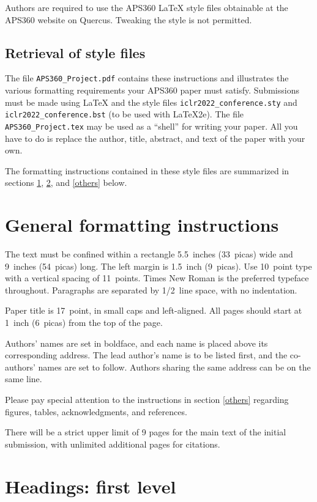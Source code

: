 \documentclass{article} %
\begin{document}
Authors are required to use the APS360 \LaTeX{} style files obtainable at the
APS360 website on Quercus. Tweaking the style is not permitted.

\subsection{Retrieval of style files}

The file \verb+APS360_Project.pdf+ contains these
instructions and illustrates the various formatting requirements your APS360 paper must satisfy.
Submissions must be made using \LaTeX{} and the style files
\verb+iclr2022_conference.sty+ and \verb+iclr2022_conference.bst+ (to be used with \LaTeX{}2e). The file
\verb+APS360_Project.tex+ may be used as a ``shell'' for writing your paper. All you have to do is replace the author, title, abstract, and text of the paper with
your own.

The formatting instructions contained in these style files are summarized in
sections \ref{gen_inst}, \ref{headings}, and \ref{others} below.

\section{General formatting instructions}
\label{gen_inst}

The text must be confined within a rectangle 5.5~inches (33~picas) wide and
9~inches (54~picas) long. The left margin is 1.5~inch (9~picas).
Use 10~point type with a vertical spacing of 11~points. Times New Roman is the
preferred typeface throughout. Paragraphs are separated by 1/2~line space,
with no indentation.

Paper title is 17~point, in small caps and left-aligned.
All pages should start at 1~inch (6~picas) from the top of the page.

Authors' names are
set in boldface, and each name is placed above its corresponding
address. The lead author's name is to be listed first, and
the co-authors' names are set to follow. Authors sharing the
same address can be on the same line.

Please pay special attention to the instructions in section \ref{others}
regarding figures, tables, acknowledgments, and references.


There will be a strict upper limit of 9 pages for the main text of the initial submission, with unlimited additional pages for citations. 

\section{Headings: first level}
\label{headings}
\end{document}

